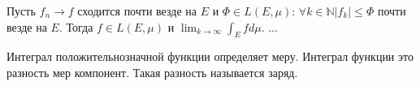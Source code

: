 \begin{theorem}
Пусть $f_n \to f$ сходится почти везде на $E$ и $\Phi \in L(E, \mu)$:
$\forall k\in \mathbb{N} |f_k| \leqslant \Phi$ почти везде на $E$.
Тогда $f\in L(E, \mu)$ и $\lim_{k\to\infty} \int_E fd\mu$.
...
\end{theorem}

Интеграл положительнозначной функции определяет меру. 
Интеграл функции это разность мер компонент. 
Такая разность называется заряд. 
